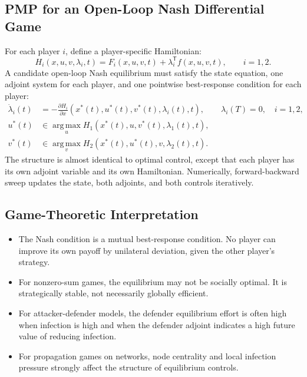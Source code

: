 \documentclass[11pt,a4paper]{article}
\newcommand{\argmax}{\operatorname*{arg\,max}}
\newcommand{\T}{\mathsf{T}}
\begin{document}
\subsection{PMP for an Open-Loop Nash Differential Game}

For each player $i$, define a player-specific Hamiltonian:
\begin{equation}
  H_i(x,u,v,\lambda_i,t)=F_i(x,u,v,t)+\lambda_i^{\T}f(x,u,v,t),\qquad i=1,2.
  \label{eq:dgame-ham}
\end{equation}
A candidate open-loop Nash equilibrium must satisfy the state equation, one adjoint system for each player, and one pointwise best-response condition for each player:
\begin{align}
  \dot{\lambda}_i(t)&=-\frac{\partial H_i}{\partial x}(x^*(t),u^*(t),v^*(t),\lambda_i(t),t),\qquad \lambda_i(T)=0,\quad i=1,2,\label{eq:dg-adjoint}\\
  u^*(t)&\in\argmax_u H_1(x^*(t),u,v^*(t),\lambda_1(t),t),\label{eq:dg-u}\\
  v^*(t)&\in\argmax_v H_2(x^*(t),u^*(t),v,\lambda_2(t),t).\label{eq:dg-v}
\end{align}
The structure is almost identical to optimal control, except that each player has its own adjoint variable and its own Hamiltonian. Numerically, forward-backward sweep updates the state, both adjoints, and both controls iteratively.

\subsection{Game-Theoretic Interpretation}

\begin{itemize}
  \item The Nash condition is a mutual best-response condition. No player can improve its own payoff by unilateral deviation, given the other player's strategy.
  \item For nonzero-sum games, the equilibrium may not be socially optimal. It is strategically stable, not necessarily globally efficient.
  \item For attacker-defender models, the defender equilibrium effort is often high when infection is high and when the defender adjoint indicates a high future value of reducing infection.
  \item For propagation games on networks, node centrality and local infection pressure strongly affect the structure of equilibrium controls.
\end{itemize}
\end{document}
